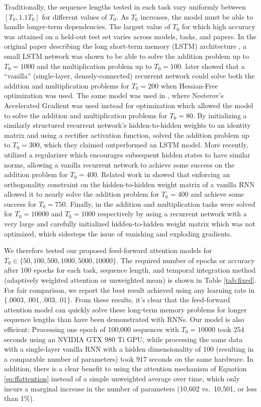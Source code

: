 \documentclass{article} %
\begin{document}
Traditionally, the sequence lengths tested in each task vary uniformly between $[T_0, 1.1T_0]$ for different values of $T_0$.
As $T_0$ increases, the model must be able to handle longer-term dependencies.
The largest value of $T_0$ for which high accuracy was attained on a held-out test set varies across models, tasks, and papers.
In the original paper describing the long short-term memory (LSTM) architecture \cite{hochreiter1997long}, a small LSTM network was shown to be able to solve the addition problem up to $T_0 = 1000$ and the multiplication problem up to $T_0 = 100$.
\cite{martens2011learning} later showed that a ``vanilla'' (single-layer, densely-connected) recurrent network could solve both the addition and multiplication problems for $T_0 = 200$ when Hessian-Free optimization was used.
The same model was used in \cite{sutskever2013importance}, where Nesterov's Accelerated Gradient was used instead for optimization which allowed the model to solve the addition and multiplication problems for $T_0 = 80$.
By initializing a similarly structured recurrent network's hidden-to-hidden weights to an identity matrix and using a rectifier activation function, \cite{le2015simple} solved the addition problem up to $T_0 = 300$, which they claimed outperformed an LSTM model.
More recently, \cite{krueger2015regularizing} utilized a regularizer which encourages subsequent hidden states to have similar norms, allowing a vanilla recurrent network to achieve some success on the addition problem for $T_0 = 400$.
Related work in \cite{arjovsky2015unitary} showed that enforcing an orthogonality constraint on the hidden-to-hidden weight matrix of a vanilla RNN allowed it to nearly solve the addition problem for $T_0 = 400$ and achieve some success for $T_0 = 750$.
Finally, in \cite{jaegar2012long} the addition and multiplication tasks were solved for $T_0 = 10000$ and $T_0 = 1000$ respectively by using a recurrent network with a very large and carefully initialized hidden-to-hidden weight matrix which was not optimized, which sidesteps the issue of vanishing and exploding gradients.

We therefore tested our proposed feed-forward attention models for $T_0 \in \{50, 100, 500, 1000, 5000, 10000\}$.
The required number of epochs or accuracy after 100 epochs for each task, sequence length, and temporal integration method (adaptively weighted attention or unweighted mean) is shown in Table \ref{tab:fixed}.
For fair comparison, we report the best result achieved using any learning rate in $\{.0003, .001, .003, .01\}$.
From these results, it's clear that the feed-forward attention model can quickly solve these long-term memory problems for longer sequence lengths than have been demonstrated with RNNs.
Our model is also efficient: Processing one epoch of 100,000 sequences with $T_0 = 10000$ took 254 seconds using an NVIDIA GTX 980 Ti GPU, while processing the same data with a single-layer vanilla RNN with a hidden dimensionality of 100 (resulting in a comparable number of parameters) took 917 seconds on the same hardware.
In addition, there is a clear benefit to using the attention mechanism of Equation \ref{eq:ffattention} instead of a simple unweighted average over time, which only incurs a marginal increase in the number of parameters (10,602 vs.\ 10,501, or less than 1\%).
\end{document}

